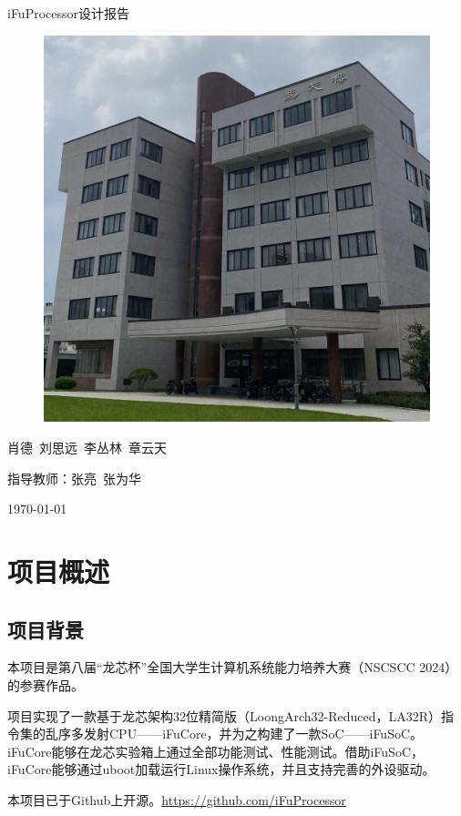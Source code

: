 \documentclass{article}
\begin{document}
\pagestyle{plain}

\begin{center}
    \Huge{iFuProcessor设计报告}
\end{center}

\vspace{30mm}

\begin{figure}[h]
    \centering
    \includegraphics[width=0.8\linewidth]{./imgs/if.jpg}
\end{figure}
\vfill

\begin{center}
    \Large{肖德\ 刘思远\ 李丛林\ 章云天}
    
    \large{指导教师：张亮\ 张为华}

    \normalsize{\today}
\end{center}

\newpage
\pagestyle{fancy}

\setcounter{tocdepth}{3}
\tableofcontents

\section{项目概述}
\subsection{项目背景}
本项目是第八届“龙芯杯”全国大学生计算机系统能力培养大赛（NSCSCC 2024）的参赛作品。\par
项目实现了一款基于龙芯架构32位精简版（LoongArch32-Reduced，LA32R）指令集的乱序多发射CPU——iFuCore，并为之构建了一款SoC——iFuSoC。iFuCore能够在龙芯实验箱上通过全部功能测试、性能测试。借助iFuSoC，iFuCore能够通过uboot加载运行Linux操作系统，并且支持完善的外设驱动。\par
本项目已于Github上开源。\url{https://github.com/iFuProcessor}
\end{document}

